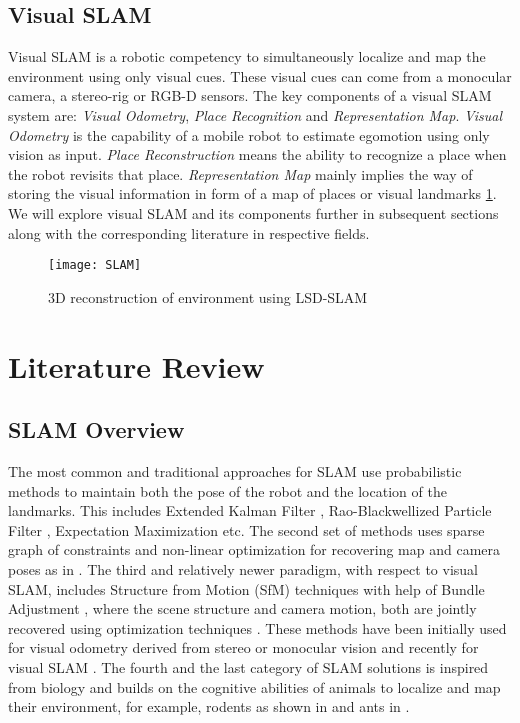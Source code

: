 \documentclass{article}
\begin{document}
\subsection{Visual SLAM}
Visual SLAM is a robotic competency to simultaneously localize and map the environment using only visual cues. These visual cues can come from a monocular camera, a stereo-rig or RGB-D sensors. The key components of a visual SLAM system are: \emph{Visual Odometry}, \emph{Place Recognition} and \emph{Representation Map}. \emph{Visual Odometry} is the capability of a mobile robot to estimate egomotion using only vision as input. \emph{Place Reconstruction} means the ability to recognize a place when the robot revisits that place. \emph{Representation Map} mainly implies the way of storing the visual information in form of a map of places or visual landmarks \ref{fig:slamExample}. We will explore visual SLAM and its components further in subsequent sections along with the corresponding literature in respective fields.

\begin{figure}[htbp]
\centering
 \texttt{[image: SLAM]}
 \caption{3D reconstruction of environment using LSD-SLAM \cite{Engel2014lsd}}
 \label{fig:slamExample}
\end{figure}

\section{Literature Review}
\subsection{SLAM Overview}
The most common and traditional approaches for SLAM use probabilistic methods to maintain both the pose of the robot and the location of the landmarks. This includes Extended Kalman Filter \cite{Chatila1985}, Rao-Blackwellized Particle Filter \cite{montemerlo2007fastslam}, Expectation Maximization \cite{thrun2005probabilistic} etc. The second set of methods uses sparse graph of constraints and non-linear optimization for recovering map and camera poses as in \cite{Olson2006, Thrun2006, Sunderhauf2012b}. The third and relatively newer paradigm, with respect to visual SLAM, includes Structure from Motion (SfM) \cite{beardsley1997sequential} techniques with help of Bundle Adjustment \cite{Triggs2000}, where the scene structure and camera motion, both are jointly recovered using optimization techniques \cite{Strasdat2010}. These methods have been initially used for visual odometry derived from stereo \cite{Nister2004, Pollefeys2004} or monocular vision \cite{Gr2015, Klein2007, Nister2004, Strasdat2010} and recently for visual SLAM \cite{Mur-Artal2015,Mouragnon2006}. The fourth and the last category of SLAM solutions is inspired from biology \cite{milford2008robot} and builds on the cognitive abilities of animals to localize and map their environment, for example, rodents as shown in \cite{Milford2004} and ants in \cite{Collett2010}.
\end{document}
